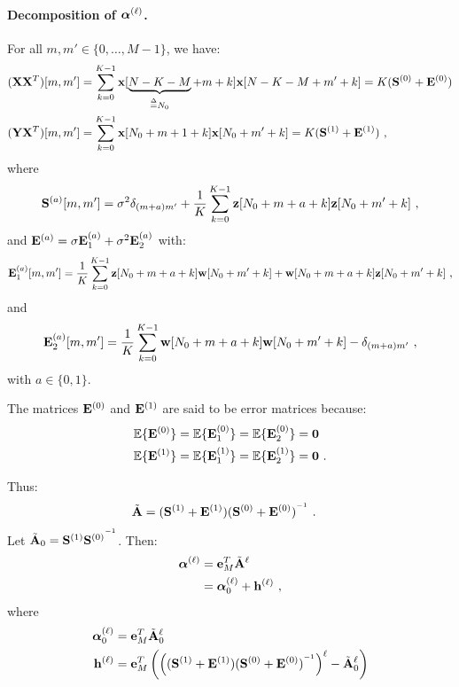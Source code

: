 \paragraph{Decomposition of $\boldsymbol{\alpha}^{(\ell)}$.}
For all $m,m'\in\{0,\ldots,M-1\}$, we have:
\begin{align}
({\mathbf X}{\mathbf X}^T)[m,m'] &= \sum_{k=0}^{K-1} {\mathbf x}[\underbrace{N-K-M}_{\overset{\Delta}{=} N_0}+m+k]{\mathbf x}[N-K-M+m'+k] = K({\mathbf S}^{(0)} + {\mathbf E}^{(0)}) \\
({\mathbf Y}{\mathbf X}^T)[m,m'] &= \sum_{k=0}^{K-1} {\mathbf x}[N_0+m+1+k]{\mathbf x}[N_0+m'+k] = K({\mathbf S}^{(1)} + {\mathbf E}^{(1)})\ ,
\end{align}
where
\[
{\mathbf S}^{(a)}[m,m'] = \sigma^2\delta_{(m+a)m'}+\dfrac1{K}\sum_{k=0}^{K-1} {\mathbf z}[N_0+m+a+k]{\mathbf z}[N_0+m'+k] \ ,
\]
and ${\mathbf E}^{(a)} = \sigma{\mathbf E}_1^{(a)} + \sigma^2{\mathbf E}_2^{(a)}$ with:
\[
{\mathbf E}_1^{(a)}[m,m'] = \dfrac1K\sum_{k=0}^{K-1} {\mathbf z}[N_0+m+a+k]{\mathbf w}[N_0+m'+k] + {\mathbf w}[N_0+m+a+k]{\mathbf z}[N_0+m'+k]\ ,
\]
and
\[
{\mathbf E}_2^{(a)}[m,m'] =  \dfrac1K\sum_{k=0}^{K-1} {\mathbf w}[N_0+m+a+k]{\mathbf w}[N_0+m'+k] - \delta_{(m+a)m'}\ ,
\]
with $a\in\{0,1\}$.
\begin{remark}
The matrices ${\mathbf E}^{(0)}$ and ${\mathbf E}^{(1)}$ are said to be error matrices because:
\begin{align*}
{\mathbb E}\{{\mathbf E}^{(0)}\} &= {\mathbb E}\{{\mathbf E}_1^{(0)}\} = {\mathbb E}\{{\mathbf E}_2^{(0)}\} = \boldsymbol{0} \\
{\mathbb E}\{{\mathbf E}^{(1)}\} &= {\mathbb E}\{{\mathbf E}_1^{(1)}\} = {\mathbb E}\{{\mathbf E}_2^{(1)}\} = \boldsymbol{0}\ .
\end{align*}
\end{remark}
Thus:
\begin{align*}
\tilde{{\mathbf A}} &= ({\mathbf S}^{(1)}+{\mathbf E}^{(1)})({\mathbf S}^{(0)}+{\mathbf E}^{(0)})^{^{-1}}\ .
\end{align*}
Let $\tilde{{\mathbf A}}_0={\mathbf S}^{(1)}{{\mathbf S}^{(0)}}^{^{-1}}$. Then:
\begin{align*}
\boldsymbol{\alpha}^{(\ell)} &= {\mathbf e}_M^T\tilde{{\mathbf A}}^\ell \\
&= \boldsymbol{\alpha}^{(\ell)}_0 + {\mathbf h}^{(\ell)}\ ,
\end{align*}
where
\begin{align}
\nonumber
\boldsymbol{\alpha}^{(\ell)}_0 &= {\mathbf e}_M^T\tilde{{\mathbf A}}_0^\ell \\
{\mathbf h}^{(\ell)} &= {\mathbf e}_M^T\left(\left(({\mathbf S}^{(1)}+{\mathbf E}^{(1)})({\mathbf S}^{(0)}+{\mathbf E}^{(0)})^{^{-1}}\right)^\ell- \tilde{{\mathbf A}}_0^\ell\right)
\label{eq:error.vec}
\end{align}
